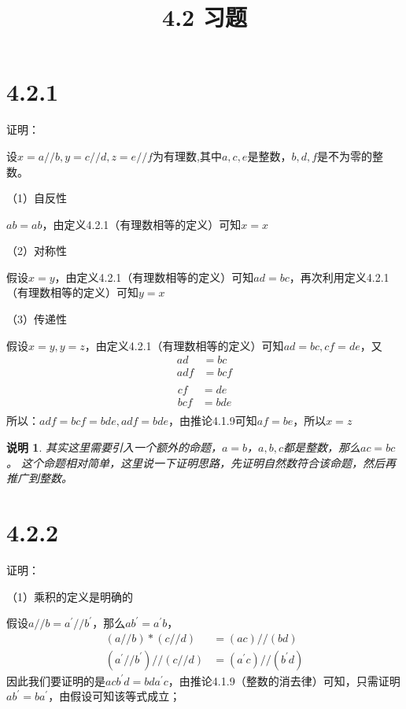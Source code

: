 \documentclass{article}
\theoremstyle{mystyle}
\newtheorem*{zremark}{说明}
\begin{document}
\title{4.2 习题}
\maketitle

\section*{4.2.1}

证明：

设$x=a//b,y=c//d,z=e//f$为有理数,其中$a,c,e$是整数，$b,d,f$是不为零的整数。

（1）自反性

$ab=ab$，由定义4.2.1（有理数相等的定义）可知$x=x$

（2）对称性

假设$x=y$，由定义4.2.1（有理数相等的定义）可知$ad=bc$，再次利用定义4.2.1（有理数相等的定义）可知$y=x$

（3）传递性

假设$x=y,y=z$，由定义4.2.1（有理数相等的定义）可知$ad=bc,cf=de$，又
\begin{align*}
  ad  & = bc  \\
  adf & = bcf \\
\end{align*}
\begin{align*}
  cf  & = de  \\
  bcf & = bde \\
\end{align*}
所以：$adf = bcf = bde, adf = bde$，由推论4.1.9可知$af=be$，所以$x=z$

\begin{zgraytheorem}
  \begin{zremark}
    其实这里需要引入一个额外的命题，$a=b$，$a,b,c$都是整数，那么$ac=bc$。
    这个命题相对简单，这里说一下证明思路，先证明自然数符合该命题，然后再推广到整数。
  \end{zremark}
\end{zgraytheorem}

\section*{4.2.2}

证明：

（1）乘积的定义是明确的

假设$a // b = a^\prime // b^\prime$，那么$a b^\prime = a^\prime b$，
\begin{align}
  (a//b)*(c//d)                      & =(ac)//(bd)                    \\
  (a^\prime // b^\prime) // (c // d) & = (a^\prime c) // (b^\prime d)
\end{align}
因此我们要证明的是$acb^\prime d = bda^\prime c$，由推论4.1.9（整数的消去律）可知，只需证明
$ab^\prime = ba^\prime$，由假设可知该等式成立；
\end{document}
